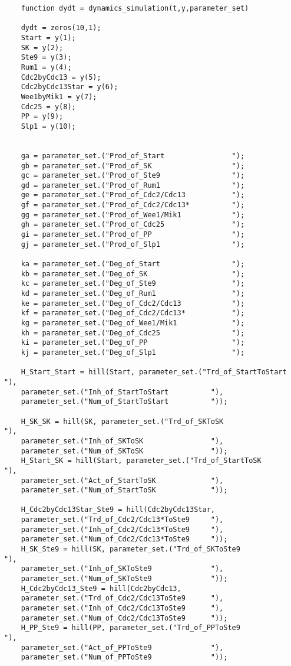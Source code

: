 \documentclass{article}
\begin{document}
\begin{verbatim}
    function dydt = dynamics_simulation(t,y,parameter_set)

    dydt = zeros(10,1);
    Start = y(1);
    SK = y(2);
    Ste9 = y(3);
    Rum1 = y(4);
    Cdc2byCdc13 = y(5);
    Cdc2byCdc13Star = y(6);
    Wee1byMik1 = y(7);
    Cdc25 = y(8);
    PP = y(9);
    Slp1 = y(10);
    
    
    ga = parameter_set.("Prod_of_Start                ");
    gb = parameter_set.("Prod_of_SK                   ");
    gc = parameter_set.("Prod_of_Ste9                 ");
    gd = parameter_set.("Prod_of_Rum1                 ");
    ge = parameter_set.("Prod_of_Cdc2/Cdc13           ");
    gf = parameter_set.("Prod_of_Cdc2/Cdc13*          ");
    gg = parameter_set.("Prod_of_Wee1/Mik1            ");
    gh = parameter_set.("Prod_of_Cdc25                ");
    gi = parameter_set.("Prod_of_PP                   ");
    gj = parameter_set.("Prod_of_Slp1                 ");
    
    ka = parameter_set.("Deg_of_Start                 ");
    kb = parameter_set.("Deg_of_SK                    ");
    kc = parameter_set.("Deg_of_Ste9                  ");
    kd = parameter_set.("Deg_of_Rum1                  ");
    ke = parameter_set.("Deg_of_Cdc2/Cdc13            ");
    kf = parameter_set.("Deg_of_Cdc2/Cdc13*           ");
    kg = parameter_set.("Deg_of_Wee1/Mik1             ");
    kh = parameter_set.("Deg_of_Cdc25                 ");
    ki = parameter_set.("Deg_of_PP                    ");
    kj = parameter_set.("Deg_of_Slp1                  ");
    
    H_Start_Start = hill(Start, parameter_set.("Trd_of_StartToStart          "), 
    parameter_set.("Inh_of_StartToStart          "), 
    parameter_set.("Num_of_StartToStart          "));
    
    H_SK_SK = hill(SK, parameter_set.("Trd_of_SKToSK                "), 
    parameter_set.("Inh_of_SKToSK                "), 
    parameter_set.("Num_of_SKToSK                "));
    H_Start_SK = hill(Start, parameter_set.("Trd_of_StartToSK             "), 
    parameter_set.("Act_of_StartToSK             "), 
    parameter_set.("Num_of_StartToSK             "));
    
    H_Cdc2byCdc13Star_Ste9 = hill(Cdc2byCdc13Star, 
    parameter_set.("Trd_of_Cdc2/Cdc13*ToSte9     "), 
    parameter_set.("Inh_of_Cdc2/Cdc13*ToSte9     "), 
    parameter_set.("Num_of_Cdc2/Cdc13*ToSte9     "));
    H_SK_Ste9 = hill(SK, parameter_set.("Trd_of_SKToSte9              "), 
    parameter_set.("Inh_of_SKToSte9              "), 
    parameter_set.("Num_of_SKToSte9              "));
    H_Cdc2byCdc13_Ste9 = hill(Cdc2byCdc13, 
    parameter_set.("Trd_of_Cdc2/Cdc13ToSte9      "), 
    parameter_set.("Inh_of_Cdc2/Cdc13ToSte9      "), 
    parameter_set.("Num_of_Cdc2/Cdc13ToSte9      "));
    H_PP_Ste9 = hill(PP, parameter_set.("Trd_of_PPToSte9              "), 
    parameter_set.("Act_of_PPToSte9              "), 
    parameter_set.("Num_of_PPToSte9              "));
    

\end{verbatim}
\end{document}
